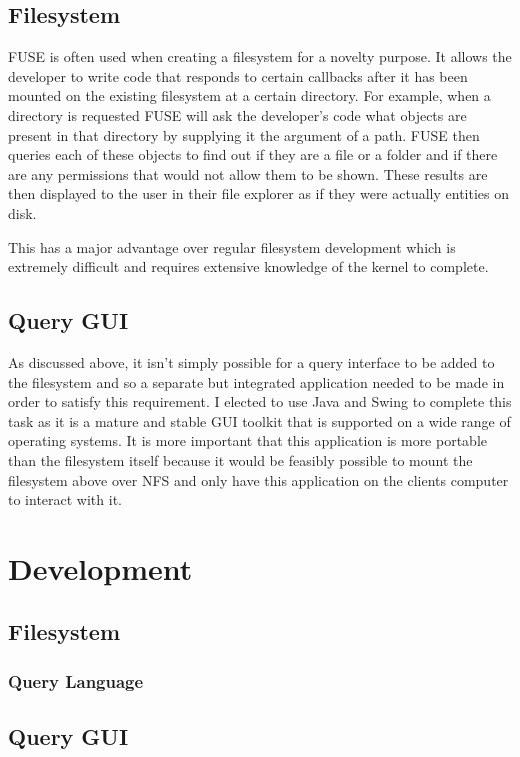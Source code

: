 \subsection{Filesystem}

\ac{FUSE} is often used when creating a filesystem for a novelty purpose. It allows the developer to write code that responds to certain callbacks after it has been mounted on the existing filesystem at a certain directory. For example, when a directory is requested \ac{FUSE} will ask the developer's code what objects are present in that directory by supplying it the argument of a path. \ac{FUSE} then queries each of these objects to find out if they are a file or a folder and if there are any permissions that would not allow them to be shown. These results are then displayed to the user in their file explorer as if they were actually entities on disk.

This has a major advantage over regular filesystem development which is extremely difficult and requires extensive knowledge of the kernel to complete.

\subsection{Query GUI}

As discussed above, it isn't simply possible for a query interface to be added to the filesystem and so a separate but integrated application needed to be made in order to satisfy this requirement. I elected to use Java and Swing to complete this task as it is a mature and stable \ac{GUI} toolkit that is supported on a wide range of operating systems. It is more important that this application is more portable than the filesystem itself because it would be feasibly possible to mount the filesystem above over \ac{NFS} and only have this application on the clients computer to interact with it.

\section{Development}

\subsection{Filesystem}

\subsubsection{Query Language}

\subsection{Query GUI}